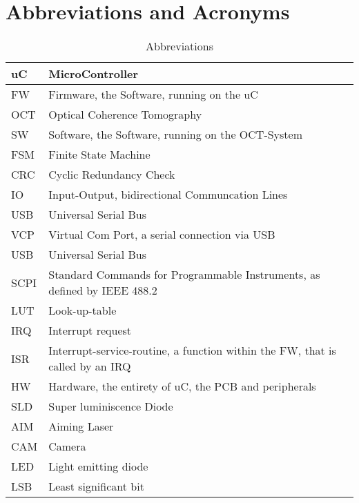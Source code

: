 	\section{Abbreviations and Acronyms}
	\begin{table}[h!]
			\begin{tabular}{|p{2cm}|l|}
			\hline	
			uC		& MicroController							\\ \hline
			FW		& Firmware, the Software, running on the uC \\ \hline	
			OCT		& Optical Coherence Tomography				\\ \hline	
			SW		& Software, the Software, running on the OCT-System 	\\ \hline	
			FSM 	& Finite State Machine									\\ \hline
			CRC		& Cyclic Redundancy Check								\\ \hline
			IO		& Input-Output, bidirectional Communcation Lines 		\\ \hline
			USB		& Universal Serial Bus									\\ \hline
			VCP		& Virtual Com Port, a serial connection via USB			\\ \hline
			USB		& Universal Serial Bus									\\ \hline
			SCPI	& Standard Commands for Programmable Instruments, as defined by IEEE 488.2	\\ \hline
			LUT		& Look-up-table											\\ \hline
			IRQ		& Interrupt request										\\ \hline
			ISR		& Interrupt-service-routine, a function within the FW, that is called by an IRQ	\\ \hline
			HW		& Hardware, the entirety of uC, the PCB and peripherals	\\ \hline
			SLD		& Super luminiscence Diode								\\ \hline
			AIM		& Aiming Laser											\\ \hline
			CAM		& Camera												\\ \hline
			LED		& Light emitting diode									\\ \hline
			LSB		& Least significant bit									\\ \hline
			\end{tabular}
			\caption{Abbreviations}
		\end{table}
